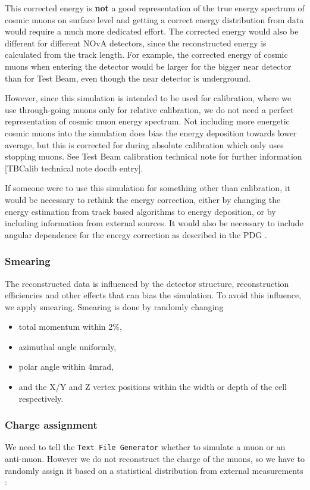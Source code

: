 \documentclass[12pt]{article}
\begin{document}
This corrected energy is \textbf{not} a good representation of the true energy spectrum of cosmic muons on surface level and getting a correct energy distribution from data would require a much more dedicated effort. The corrected energy would also be different for different NOvA detectors, since the reconstructed energy is calculated from the track length. For example, the corrected energy of cosmic muons when entering the detector would be larger for the bigger near detector than for Test Beam, even though the near detector is underground. 

However, since this simulation is intended to be used for calibration, where we use through-going muons only for relative calibration, we do not need a perfect representation of cosmic muon energy spectrum. Not including more energetic cosmic muons into the simulation does bias the energy deposition towards lower average, but this is corrected for during absolute calibration which only uses stopping muons. See Test Beam calibration technical note for further information [TBCalib technical note docdb entry].

If someone were to use this simulation for something other than calibration, it would be necessary to rethink the energy correction, either by changing the energy estimation from track based algorithms to energy deposition, or by including information from external sources. It would also be necessary to include angular dependence for the energy correction as described in the PDG \cite{rpp2022-rev-cosmic-rays.pdf}.

\subsubsection{Smearing}
The reconstructed data is influenced by the detector structure, reconstruction efficiencies and other effects that can bias the simulation. To avoid this influence, we apply smearing. Smearing is done by randomly changing
\begin{itemize}
\item total momentum within 2\%,
\item azimuthal angle uniformly,
\item polar angle within 4mrad,
\item and the X/Y and Z vertex positions within the width or depth of the cell respectively.
\end{itemize}

\subsubsection{Charge assignment}
We need to tell the \texttt{Text File Generator} whether to simulate a muon or an anti-muon. However we do not reconstruct the charge of the muons, so we have to randomly assign it based on a statistical distribution from external measurements \cite{NOVA-doc-51327-v3}:
\end{document}
